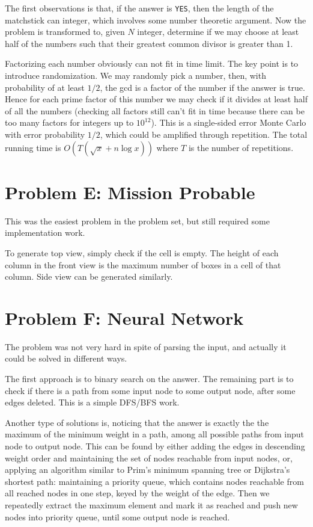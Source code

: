 \documentclass[a4paper,10.5pt,twoside]{article}
\begin{document}
The first observations is that, if the answer is \texttt{YES}, then the length of the matchstick can integer, which involves some number theoretic argument. Now the problem is transformed to, given $N$ integer, determine if we may choose at least half of the numbers such that their greatest common divisor is greater than 1.

Factorizing each number obviously can not fit in time limit. The key point is to introduce randomization. We may randomly pick a number, then, with probability of at least $1/2$, the gcd is a factor of the number if the answer is true. Hence  for each prime factor of this number we may check if it divides at least half of all the numbers (checking all factors still can't fit in time because there can be too many factors for integers up to $10^{12}$). This is a single-sided error Monte Carlo with error probability $1/2$, which could be amplified through repetition. The total running time is $O(T(\sqrt{x} + n \log x))$ where $T$ is the number of repetitions.

\section*{Problem E: Mission Probable}

This was the easiest problem in the problem set, but still required some implementation work.

To generate top view, simply check if the cell is empty. The height of each column in the front view is the maximum number of boxes in a cell of that column. Side view can be generated similarly.

\section*{Problem F: Neural Network}

The problem was not very hard in spite of parsing the input, and actually it could be solved in different ways.

The first approach is to binary search on the answer. The remaining part is to check if there is a path from some input node to some output node, after some edges deleted. This is a simple DFS/BFS work.

Another type of solutions is, noticing that the answer is exactly the the maximum of the minimum weight in a path, among all possible paths from input node to output node. This can be found by either adding the edges in descending weight order and maintaining the set of nodes reachable from input nodes, or, applying an algorithm similar to Prim's minimum spanning tree or Dijkstra's shortest path: maintaining a priority queue, which contains nodes reachable from all reached nodes in one step, keyed by the weight of the edge. Then we repeatedly extract the maximum element and mark it as reached and push new nodes into priority queue, until some output node is reached.
\end{document}
